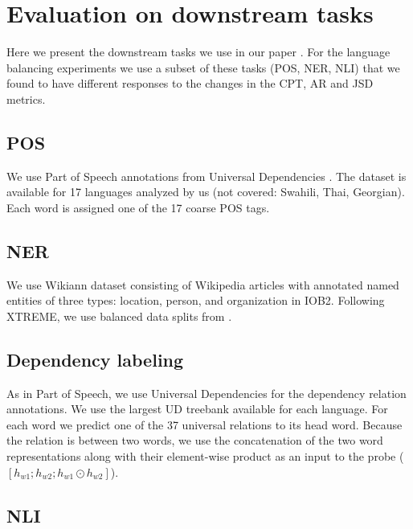 
\section{Evaluation on downstream tasks}

Here we present the downstream tasks we use in our paper \cite{limisiewicz_tokenization_2023}. For the language balancing experiments we use a subset of these tasks (POS, NER, NLI) that we found to have different responses to the changes in the CPT, AR and JSD metrics.

\subsection{POS}

We use Part of Speech annotations from Universal Dependencies \cite{nivre_universal_2020}. The dataset is available for 17 languages analyzed by us (not covered: Swahili, Thai, Georgian). Each word is assigned one of the 17 coarse POS tags.

\subsection{NER}

We use Wikiann dataset \cite{pan_cross-lingual_2017} consisting of Wikipedia articles with annotated named entities of three types: location, person, and organization in IOB2. Following XTREME, we use balanced data splits from \cite{rahimi_massively_2019}.

\subsection{Dependency labeling}

As in Part of Speech, we use Universal Dependencies \cite{nivre_universal_2020} for the dependency relation annotations. We use the largest UD treebank available for each language.
For each word we predict one of the 37 universal relations to its head word. Because the relation is between two words, we use the concatenation of the two word representations along with their element-wise product as an input to the probe ($[h_{w1}; h_{w2}; h_{w1} \odot h_{w2}]$).

\subsection{NLI}

